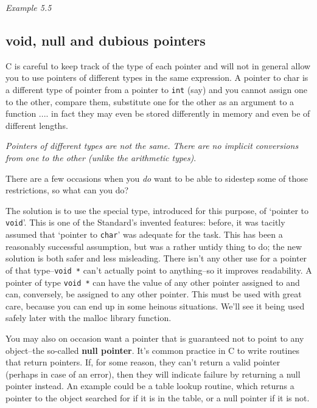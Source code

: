    \begin{center}\textit{Example 5.5}\end{center}


  

  \subsection{void, null and dubious pointers}
   

   C is careful to keep track of the type of each pointer and will not in
    general allow you to use pointers of different types in the same
    expression. A pointer to char is a different type of pointer from
    a pointer to \texttt{int} (say) and you cannot assign one to the
    other, compare them, substitute one for the other as an argument to
    a function .... in fact they may even be stored differently in memory
    and even be of different lengths.


   \textit{Pointers of different types are not the same. There are no
    implicit conversions from one to the other (unlike the arithmetic
    types)}.


   There are a few occasions when you \textit{do} want to be able to
    sidestep some of those restrictions, so what can you do?


   The solution is to use the special type, introduced for this purpose,
    of `pointer to \texttt{void}'. This is one of the Standard's
    invented features: before, it was tacitly assumed that `pointer to
    \texttt{char}' was adequate for the task. This has been
    a reasonably successful assumption, but was a rather untidy thing to do;
    the new solution is both safer and less misleading. There isn't any
    other use for a pointer of that type--\texttt{void *} can't
    actually point to anything--so it improves readability. A pointer of
    type \texttt{void *} can have the value of any other pointer
    assigned to and can, conversely, be assigned to any other pointer. This
    must be used with great care, because you can end up in some heinous
    situations. We'll see it being used safely later with the malloc library
    function.


   You may also on occasion want a pointer that is guaranteed not to
    point to any object--the so-called \textbf{null pointer}. It's
    common practice in C to write routines that return pointers. If, for
    some reason, they can't return a valid pointer (perhaps in case of an
    error), then they will indicate failure by returning a null pointer
    instead. An example could be a table lookup routine, which returns
    a pointer to the object searched for if it is in the table, or a null
    pointer if it is not.


